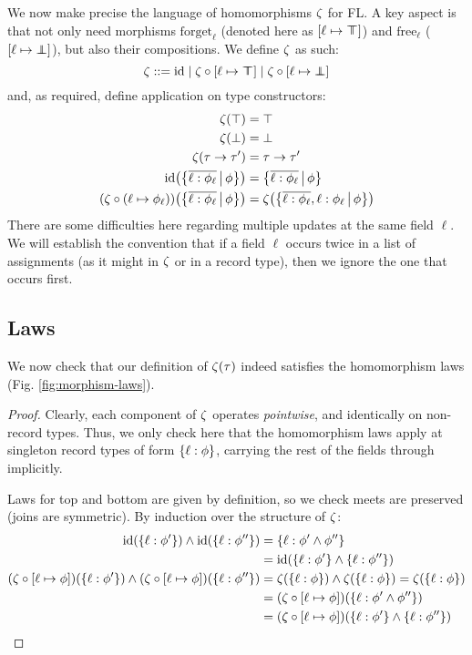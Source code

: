 We now make precise the language of homomorphisms $\zeta$ for FL. A key aspect is that not only need morphisms $\mathrm{forget}_\ell$ (denoted here as $[\ell \mapsto \top \!\!\!\! \top]$) and $\mathrm{free}_\ell$ ($[\ell \mapsto \bot \!\!\!\! \bot]$), but also their compositions. We define $\zeta$ as such:
$$ \morph ::= \mathrm{id} \mid \morph \circ [\ell \mapsto \flftop] \mid \morph \circ [\ell \mapsto \flfbot]  $$
and, as required, define application on type constructors:
\begin{align*}
    \morph(\top) &= \top \\ \morph(\bot) &= \bot \\ 
    \morph(\tau \to \tau') &= \tau \to \tau' \\
    \id \left( \flext{\overline {\ell : \phi_\ell}}{\phi} \right) &= \flext{\overline {\ell : \phi_\ell}}{\phi} \\
    (\morph \circ (\ell \mapsto \phi_\ell)) \left( \flext{\overline {\ell : \phi_\ell}}{\phi} \right) &= \morph \left( \flext{\overline {\ell : \phi_\ell}, \ell : \phi_\ell}{\phi} \right)
\end{align*}
There are some difficulties here regarding multiple updates at the same field $\ell$. We will establish the convention that if a field $\ell$ occurs twice in a list of assignments (as it might in $\zeta$ or in a record type), then we ignore the one that occurs first.

\subsection{Laws}

We now check that our definition of $\zeta(\tau)$ indeed satisfies the homomorphism laws (Fig. \ref{fig:morphism-laws}).

\begin{proof}
Clearly, each component of $\zeta$ operates \emph{pointwise}, and identically on non-record types. Thus, we only check here that the homomorphism laws apply at singleton record types of form $\flrec{\ell : \phi}$, carrying the rest of the fields through implicitly. 

Laws for top and bottom are given by definition, so we check meets are preserved (joins are symmetric). By induction over the structure of $\zeta$:
\begin{align*}
\id \left( \flrec{\ell : \phi'} \right) \meet \id \left( \flrec{\ell : \phi''} \right) &= 
\flrec{\ell : \phi' \meet \phi''} \\ &= \id \left( \flrec{\ell : \phi'}  \meet \flrec{\ell : \phi''} \right) \\
(\morph \circ [\ell \mapsto \phi])\left( \flrec{\ell : \phi'} \right) \meet (\morph \circ [\ell \mapsto \phi])\left( \flrec{\ell : \phi''} \right) &= \morph \left( \flrec{\ell : \phi} \right) \meet \morph \left( \flrec{\ell: \phi} \right) = \morph \left( \flrec{\ell: \phi} \right) \\ 
&= (\morph \circ [\ell \mapsto \phi])\left( \flrec{\ell : \phi' \meet \phi''} \right) \\ 
&= (\morph \circ [\ell \mapsto \phi])\left( \flrec{\ell : \phi'} \meet \flrec{\ell : \phi''} \right)
\end{align*}    
\end{proof}

